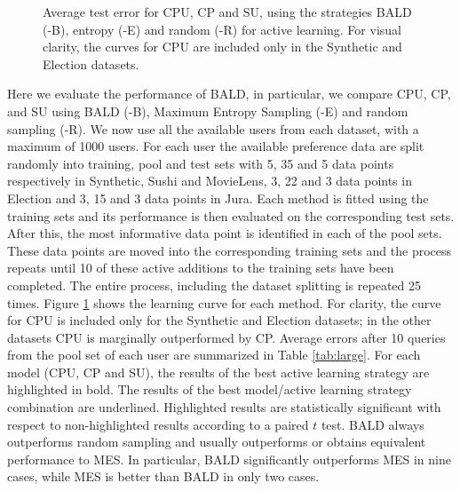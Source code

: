 \begin{figure}[h!]
{\begin{tabular}{ccc}
\end{tabular}
}
\caption{Average test error for CPU, CP and SU, using the strategies BALD (-B), entropy (-E) and random (-R) for active learning.
For visual clarity, the curves for CPU are included only in the Synthetic and Election datasets.}
\label{fig:learningcurves}
\end{figure}

Here we evaluate the performance of BALD,
in particular, we compare CPU, CP, and SU using BALD (-B), Maximum Entropy Sampling (-E) and random sampling (-R).
We now use all the available users from each dataset, with a maximum of 1000 users.
For each user the available preference data are
split randomly into training, pool and test sets with 5, 35 and 5 data points respectively
in Synthetic, Sushi and MovieLens, 3, 22 and 3 data points in Election
and 3, 15 and 3 data points in Jura.
Each method is fitted using the training sets and its performance
is then evaluated on the corresponding test sets. After this,
the most informative data point is identified in each
of the pool sets. These data points are moved into the corresponding training sets
and the process repeats until 10 of these active
additions to the training sets have been completed.
The entire process, including the dataset splitting is repeated 25 times. 
Figure \ref{fig:learningcurves} shows the learning curve for each method.
For clarity, the curve for CPU is included only for the Synthetic and Election datasets; in the other datasets CPU is marginally outperformed by CP.
Average errors after 10 queries from the pool set of each user are summarized in Table \ref{tab:large}.
For each model (CPU, CP and SU), the results of the best active learning strategy are highlighted in bold.
The results of the best model/active learning strategy combination are underlined.
Highlighted results are statistically significant with respect to non-highlighted
results according to a paired $t$ test.
BALD always outperforms random sampling and usually outperforms or obtains equivalent performance to MES. 
In particular, BALD significantly outperforms MES in nine cases,
while MES is better than BALD in only two cases.
